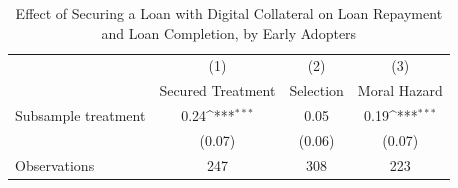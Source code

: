 \begin{table}[htbp]\centering
\def\sym#1{\ifmmode^{#1}\else\(^{#1}\)\fi}
\caption{Effect of Securing a Loan with Digital Collateral on Loan Repayment and Loan Completion, by Early Adopters\label{LASMH\_complete\_earlyadopt\_ITT\_200}}
\begin{tabular}{l*{3}{c}}
\toprule
                    &\multicolumn{1}{c}{(1)}&\multicolumn{1}{c}{(2)}&\multicolumn{1}{c}{(3)}\\
                    &\multicolumn{1}{c}{Secured Treatment}&\multicolumn{1}{c}{Selection}&\multicolumn{1}{c}{Moral Hazard}\\
\midrule
Subsample treatment &        0.24\sym{***}&        0.05         &        0.19\sym{***}\\
                    &      (0.07)         &      (0.06)         &      (0.07)         \\
\midrule
Observations        &         247         &         308         &         223         \\
\bottomrule
\end{tabular}
\end{table}
